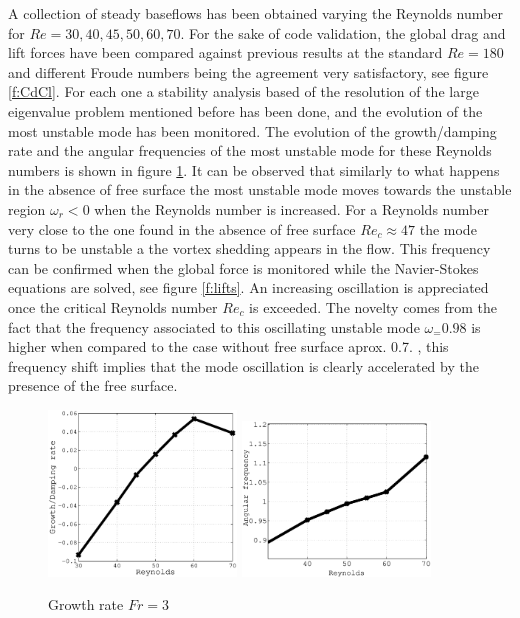 \documentclass[%
 reprint,
 amsmath,amssymb,
 aps,
prl
]{revtex4-1}
\begin{document}
A collection of steady baseflows has been obtained varying the Reynolds number for $Re=30,40,45,50,60,70$. For the sake of code validation, the global drag and lift forces have been compared against previous results\cite{Bouscasse15} at the standard $Re=180$ and different Froude numbers being the agreement very satisfactory, see figure \ref{f:CdCl}. For each one a stability analysis based of the resolution of the large eigenvalue problem mentioned before has been done, and the evolution of the most unstable mode has been monitored. The evolution of the growth/damping rate and the angular frequencies of the most unstable mode for these Reynolds numbers is shown in figure \ref{f:omegas}. It can be observed that similarly to what happens in the absence of free surface the most unstable mode moves towards the unstable region $\omega_r<0$ when the Reynolds number is increased. For a Reynolds number very close to the one found in the absence of free surface $Re_c\approx 47$ the mode turns to be unstable a the vortex shedding appears in the flow. This frequency can be confirmed when the global force is monitored while the Navier-Stokes equations are solved, see figure \ref{f:lifts}. An increasing oscillation is appreciated once the critical Reynolds number $Re_c$ is exceeded. The novelty comes from the fact that the frequency associated to this oscillating unstable mode $\omega_= 0.98$ is higher when compared to the case without free surface aprox. 0.7. , this frequency shift implies that the mode oscillation is clearly accelerated by the presence of the free surface.


\begin{figure}
  \begin{center}
    \includegraphics[width=5cm]{Growth.eps}
    \includegraphics[width=5cm]{Freq.eps}\\
  \end{center}
  \caption{Growth rate $Fr=3$}
  \label{f:omegas}
\end{figure}
\end{document}
